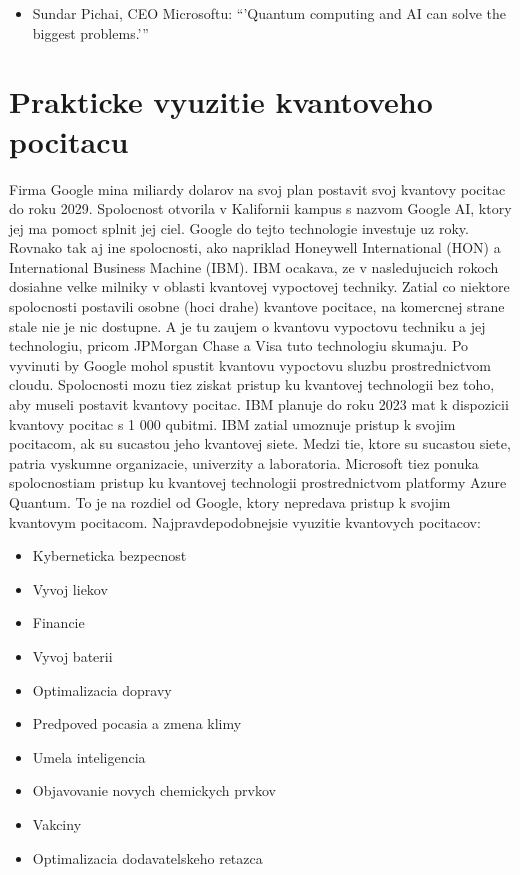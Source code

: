 \documentclass{article}
\begin{document}
\begin{itemize}
\item Sundar Pichai, CEO Microsoftu: \enquote{'Quantum computing and AI can solve the biggest problems.'}
\end{itemize}

\section{Prakticke vyuzitie kvantoveho pocitacu}
Firma Google mina miliardy dolarov na svoj plan postavit svoj kvantovy pocitac do roku 2029. Spolocnost otvorila v Kalifornii kampus s nazvom Google AI, ktory jej ma pomoct splnit jej ciel. Google do tejto technologie investuje uz roky. Rovnako tak aj ine spolocnosti, ako napriklad Honeywell International (HON) a International Business Machine (IBM). IBM ocakava, ze v nasledujucich rokoch dosiahne velke milniky v oblasti kvantovej vypoctovej techniky.
\bigbreak
Zatial co niektore spolocnosti postavili osobne (hoci drahe) kvantove pocitace, na komercnej strane stale nie je nic dostupne. A je tu zaujem o kvantovu vypoctovu techniku   a jej technologiu, pricom JPMorgan Chase a Visa tuto technologiu skumaju. Po vyvinuti by Google mohol spustit kvantovu vypoctovu sluzbu prostrednictvom cloudu.
\bigbreak
Spolocnosti mozu tiez ziskat pristup ku kvantovej technologii bez toho, aby museli postavit kvantovy pocitac. IBM planuje do roku 2023 mat k dispozicii kvantovy pocitac s 1 000 qubitmi. IBM zatial umoznuje pristup k svojim pocitacom, ak su sucastou jeho kvantovej siete. Medzi tie, ktore su sucastou siete, patria vyskumne organizacie, univerzity a laboratoria.
\bigbreak
Microsoft tiez ponuka spolocnostiam pristup ku kvantovej technologii prostrednictvom platformy Azure Quantum. To je na rozdiel od Google, ktory nepredava pristup k svojim kvantovym pocitacom.
\bigbreak
Najpravdepodobnejsie vyuzitie kvantovych pocitacov:
\begin{itemize}
\item Kyberneticka bezpecnost
\item Vyvoj liekov
\item Financie
\item Vyvoj baterii
\item Optimalizacia dopravy
\item Predpoved pocasia a zmena klimy
\item Umela inteligencia
\item Objavovanie novych chemickych prvkov
\item Vakciny
\item Optimalizacia dodavatelskeho retazca
\end{itemize}
\end{document}
